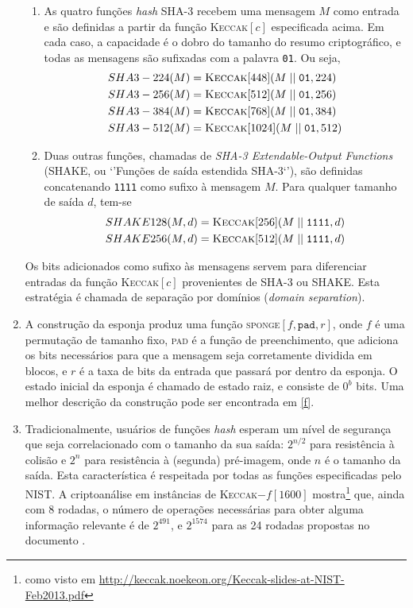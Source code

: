 \documentclass{article}
\begin{document}
\begin{enumerate}[label=(\alph*)]
\begin{enumerate}[label=\roman*.]
\item As quatro funções \emph{hash} SHA-3 recebem uma mensagem $M$ como entrada
e são definidas a partir da função \textsc{Keccak}$[c]$ especificada acima. Em
cada caso, a capacidade é o dobro do tamanho do resumo criptográfico, e todas
as mensagens são sufixadas com a palavra \texttt{01}. Ou seja,
\begin{align*}
SHA3-224(M) &= \textsc{Keccak}[448](M \mid\mid \texttt{01}, 224) \\
SHA3-256(M) &= \textsc{Keccak}[512](M \mid\mid \texttt{01}, 256) \\
SHA3-384(M) &= \textsc{Keccak}[768](M \mid\mid \texttt{01}, 384) \\
SHA3-512(M) &= \textsc{Keccak}[1024](M \mid\mid \texttt{01}, 512)
\end{align*}

\item Duas outras funções, chamadas de \emph{SHA-3 Extendable-Output Functions}
(SHAKE, ou `'Funções de saída estendida SHA-3`'), são definidas concatenando
\texttt{1111} como sufixo à mensagem $M$. Para qualquer tamanho de saída $d$,
tem-se
\begin{align*}
SHAKE128(M, d) &= \textsc{Keccak}[256](M \mid\mid \texttt{1111}, d) \\
SHAKE256(M, d) &= \textsc{Keccak}[512](M \mid\mid \texttt{1111}, d)
\end{align*}

\end{enumerate}

Os bits adicionados como sufixo às mensagens servem para diferenciar entradas
da função \textsc{Keccak}$[c]$ provenientes de SHA-3 ou SHAKE. Esta estratégia
é chamada de separação por domínios (\emph{domain separation}).

\item \label{i} A construção da esponja produz uma função \textsc{sponge}$[f,
\texttt{pad}, r]$, onde $f$ é uma permutação de tamanho fixo, \textsc{pad} é
a função de preenchimento, que adiciona os bits necessários para que a
mensagem seja corretamente dividida em blocos, e $r$ é a taxa de bits da
entrada que passará por dentro da esponja. O estado inicial da esponja é
chamado de estado raiz, e consiste de $0^b$ bits. Uma melhor descrição da
construção pode ser encontrada em \ref{f}.

\item Tradicionalmente, usuários de funções \emph{hash} esperam um nível de
segurança que seja correlacionado com o tamanho da sua saída: $2^{n/2}$ para
resistência à colisão e $2^n$ para resistência à (segunda) pré-imagem, onde
$n$ é o tamanho da saída. Esta característica é respeitada por todas as
funções especificadas pelo NIST. A criptoanálise em instâncias de
\textsc{Keccak}$-f[1600]$ mostra\footnote{como visto em
\url{http://keccak.noekeon.org/Keccak-slides-at-NIST-Feb2013.pdf}} que, ainda
com 8 rodadas, o número de operações necessárias para obter alguma informação
relevante é de $2^{491}$, e $2^{1574}$ para as 24 rodadas propostas no
documento \cite{Dworkin2015}.


\end{enumerate}
\end{document}
